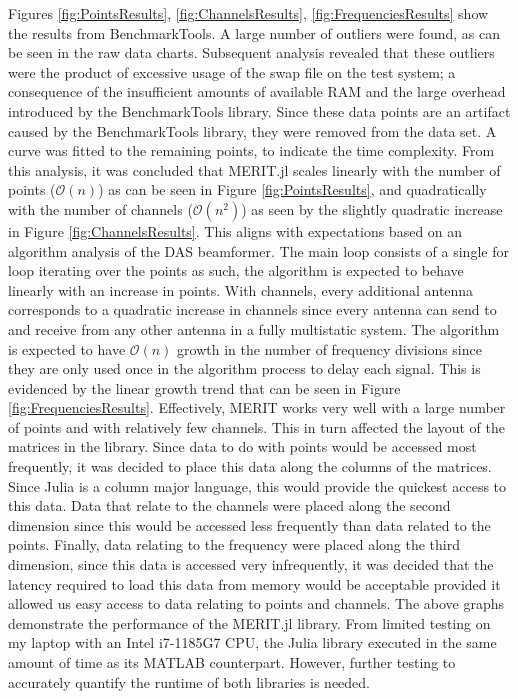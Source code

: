 Figures \ref{fig:PointsResults}, \ref{fig:ChannelsResults}, \ref{fig:FrequenciesResults} show the results from
BenchmarkTools. A large number of outliers were found, as can be seen in the raw data charts. Subsequent analysis
revealed that these outliers were the product of excessive usage of the swap file on the test system; a consequence of
the insufficient amounts of available RAM and the large overhead introduced by the BenchmarkTools library. Since these
data points are an artifact caused by the BenchmarkTools library, they were removed from the data set. A curve was
fitted to the remaining points, to indicate the time complexity. From this analysis, it was concluded that MERIT.jl
scales linearly with the number of points ($\mathcal{O}(n)$) as can be seen in Figure \ref{fig:PointsResults}, and
quadratically with the number of channels ($\mathcal{O}(n^2)$) as seen by the slightly quadratic increase in Figure
\ref{fig:ChannelsResults}. This aligns with expectations based on an algorithm analysis of the DAS beamformer. The main
loop consists of a single for loop iterating over the points as such, the algorithm is expected to behave linearly with
an increase in points. With channels, every additional antenna corresponds to a quadratic increase in channels since
every antenna can send to and receive from any other antenna in a fully multistatic system. The algorithm is expected to
have $\mathcal{O}(n)$ growth in the number of frequency divisions since they are only used once in the algorithm process
to delay each signal. This is evidenced by the linear growth trend that can be seen in Figure
\ref{fig:FrequenciesResults}. Effectively, MERIT works very well with a large number of points and with relatively few
channels. This in turn affected the layout of the matrices in the library. Since data to do with points would be
accessed most frequently, it was decided to place this data along the columns of the matrices. Since Julia is a column
major language, this would provide the quickest access to this data. Data that relate to the channels were placed along
the second dimension since this would be accessed less frequently than data related to the points. Finally, data
relating to the frequency were placed along the third dimension, since this data is accessed very infrequently, it was
decided that the latency required to load this data from memory would be acceptable provided it allowed us easy access
to data relating to points and channels. The above graphs demonstrate the performance of the MERIT.jl library. From
limited testing on my laptop with an Intel i7-1185G7 CPU, the Julia library executed in the same amount of time as its
MATLAB counterpart. However, further testing to accurately quantify the runtime of both libraries is needed.


